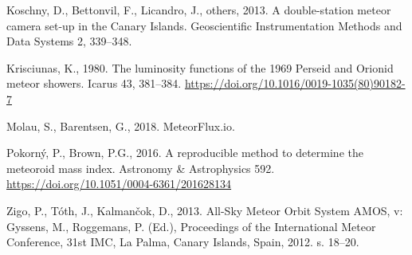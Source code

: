 \leavevmode\hypertarget{ref-koschny2013}{}%
Koschny, D., Bettonvil, F., Licandro, J., others, 2013. A double-station
meteor camera set-up in the Canary Islands. Geoscientific
Instrumentation Methods and Data Systems 2, 339--348.

\leavevmode\hypertarget{ref-krisciunas1980}{}%
Krisciunas, K., 1980. The luminosity functions of the 1969 Perseid and
Orionid meteor showers. Icarus 43, 381--384.
\url{https://doi.org/10.1016/0019-1035(80)90182-7}

\leavevmode\hypertarget{ref-meteorflux}{}%
Molau, S., Barentsen, G., 2018. MeteorFlux.io.

\leavevmode\hypertarget{ref-pokorny-brown2016}{}%
Pokorný, P., Brown, P.G., 2016. A reproducible method to determine the
meteoroid mass index. Astronomy \& Astrophysics 592.
\url{https://doi.org/10.1051/0004-6361/201628134}

\leavevmode\hypertarget{ref-zigo2013}{}%
Zigo, P., Tóth, J., Kalmančok, D., 2013. All-Sky Meteor Orbit System
AMOS, v: Gyssens, M., Roggemans, P. (Ed.), Proceedings of the
International Meteor Conference, 31st IMC, La Palma, Canary Islands,
Spain, 2012. s. 18--20.
